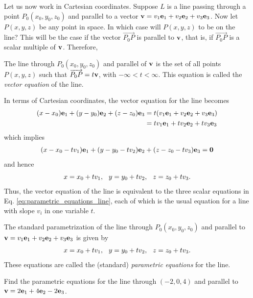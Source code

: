 \documentclass[12pt,letterpaper,reqno]{article}
\numberwithin{equation}{section}
\newcommand{\ti}[1]{\textit{#1}}
\begin{document}
Let us now work in Cartesian coordinates. Suppose $L$ is a line passing through a point $P_0(x_0,y_0,z_0)$ and parallel to a vector ${\bf v}=v_1{\bf e}_1+v_2{\bf e}_2+v_3{\bf e}_3$. Now let $P(x,y,z)$ be any point in space. In which case will $P(x,y,z)$ to be on the line? This will be the case if the vector $\overrightarrow{P_0P}$ is parallel to ${\bf v}$, that is, if $\overrightarrow{P_0P}$ is a scalar multiple of ${\bf v}$. Therefore,
\begin{defn}
	The line through $P_0(x_0,y_0,z_0)$ and parallel of ${\bf v}$ is the set of all points $P(x,y,z)$ such that $\overrightarrow{P_0P}=t{\bf v}$, with $-\infty < t < \infty$. This equation is called the \ti{vector equation} of the line.
\end{defn}
In terms of Cartesian coordinates, the vector equation for the line becomes
\begin{align*}
	(x-x_0){\bf e}_1+(y-y_0){\bf e}_2+(z-z_0){\bf e}_3&=t(v_1{\bf e}_1+v_2{\bf e}_2+v_3{\bf e}_3) \\
	&=tv_1{\bf e}_1+tv_2{\bf e}_2+tv_3{\bf e}_3
\end{align*}
which implies
\begin{align*}
	(x-x_0-tv_1){\bf e}_1+(y-y_0-tv_2){\bf e}_2+(z-z_0-tv_3){\bf e}_3={\bf 0}
\end{align*}
and hence
\begin{equation}\label{eq:parametric_equations_line}
	x=x_0+tv_1, \hspace{0.25cm} y=y_0+tv_2, \hspace{0.25cm} z=z_0+tv_3.
\end{equation}
Thus, the vector equation of the line is equivalent to the three scalar equations in Eq. \eqref{eq:parametric_equations_line}, each of which is the usual equation for a line with slope $v_i$ in one variable $t$.

\begin{defn}
	The standard parametrization of the line through $P_0(x_0,y_0,z_0)$ and parallel to ${\bf v}=v_1{\bf e}_1+v_2{\bf e}_2+v_3{\bf e}_3$ is given by
	\begin{align*}
		x=x_0+tv_1, \hspace{0.25cm} y=y_0+tv_2, \hspace{0.25cm} z=z_0+tv_3.
	\end{align*}
	These equations are called the (standard) \ti{parametric equations} for the line.
\end{defn}

\begin{exercise}
Find the parametric equations for the line through $(-2,0,4)$ and parallel to ${\bf v}=2{\bf e}_1+4{\bf e}_2-2{\bf e}_3$.	
\end{exercise}
\end{document}

